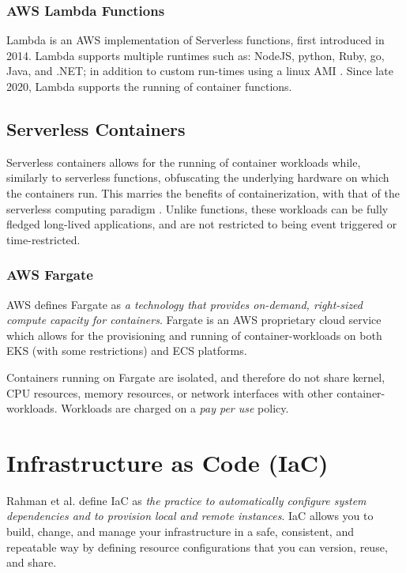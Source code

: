 \subsubsection{AWS Lambda Functions}
Lambda\cite{musgrave_2022} is an AWS implementation of Serverless functions, first introduced in 2014\cite{handy_2014}.
Lambda supports multiple runtimes such as: NodeJS, python, Ruby, go, Java, and .NET; in addition to custom run-times using a linux AMI \cite{musgrave_2022_runtimes}.
Since late 2020, Lambda supports the running of container functions\cite{lambda}.

\subsection{Serverless Containers}
Serverless containers allows for the running of container workloads while, similarly to serverless functions, obfuscating the underlying hardware on which the containers run. 
This marries the benefits of containerization, with that of the serverless computing paradigm \cite{PEREZ201850}. 
Unlike functions, these workloads can be fully fledged long-lived applications, and are not restricted to being event triggered or time-restricted.

\subsubsection{AWS Fargate}
AWS defines Fargate as \emph{a technology that provides on-demand, right-sized compute capacity for containers}\cite{hansen_2022_fargate}. 
Fargate is an AWS proprietary cloud service which allows for the provisioning and running of container-workloads on both EKS (with some restrictions) and ECS platforms. 

Containers running on Fargate are isolated, and therefore do not share kernel, CPU resources, memory resources, or network interfaces with other container-workloads.
Workloads are charged on a \textit{pay per use} policy.

\section{Infrastructure as Code (IaC)}
Rahman et al. define IaC as \emph{the practice to automatically configure system dependencies and to provision local and remote instances}\cite{RAHMAN201965}.
IaC allows you to build, change, and manage your infrastructure in a safe, consistent, and repeatable way by defining resource configurations that you can version, reuse, and share\cite{hashicorp_tf_iac}.

